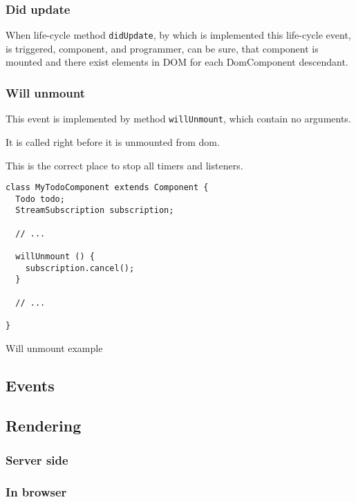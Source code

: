     \subsubsection{Did update}\label{subsec:our-architecture-lifecycle-didupdate}

      When life-cycle method \texttt{didUpdate}, 
      by which is implemented this life-cycle event, 
      is triggered, component, and programmer, can be sure, 
      that component is mounted and there exist elements in DOM for each DomComponent descendant.

    \subsubsection{Will unmount}\label{subsec:our-architecture-lifecycle-willunmount}

      This event is implemented by method \texttt{willUnmount}, which contain no arguments.
      
      It is called right before it is unmounted from dom. 

      This is the correct place to stop all timers and listeners.
      \begin{listing}
        \begin{verbatim}
class MyTodoComponent extends Component {
  Todo todo;
  StreamSubscription subscription;

  // ...

  willUnmount () {
    subscription.cancel();
  }

  // ...

}
        \end{verbatim}
        \caption{Will unmount example}
        \label{subsec:our-architecture-lifecycle-willunmount-example}
      \end{listing}

  \subsection{Events}\label{subsec:our-architecture-events}
  \subsection{Rendering}\label{subsec:our-architecture-rendering}
  \subsubsection{Server side}\label{subsec:our-architecture-rendering-server}
  \subsubsection{In browser}\label{subsec:our-architecture-rendering-browser}
